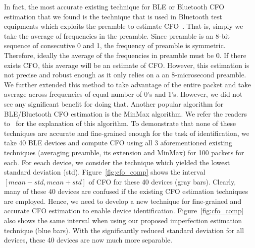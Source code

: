 In fact, the most accurate existing technique for BLE or Bluetooth CFO estimation that we found is the technique that is used in Bluetooth test equipments which exploits the preamble to estimate CFO~\cite{}. That is, simply we take the average of frequencies in the preamble. Since preamble is an 8-bit sequence of consecutive 0 and 1, the frequency of preamble is symmetric. Therefore, ideally the average of the frequencies in preamble must be 0. If there exists CFO, this average will be an estimate of CFO. However, this estimation is not precise and robust enough as it only relies on a an 8-microsecond preamble. We further extended this method to take advantage of the entire packet and take average across frequencies of equal number of 0's and 1's. However, we did not see any significant benefit for doing that. Another popular algorithm for BLE/Bluetooth CFO estimation is the MinMax algorithm. We refer the readers to~\cite{} for the explanation of this algorithm. To demonstrate that none of these techniques are accurate and fine-grained enough for the task of identification, we take 40 BLE devices and compute CFO using all 3 aforementioned existing techniques (averaging preamble, its extension and MinMax) for 100 packets for each. For eeach device, we consider the technique which yielded the lowest standard deviation (std). Figure~\ref{fig:cfo_comp} shows the interval $[mean-std,mean+std]$ of CFO for these 40 devices (gray bars). Clearly, many of these 40 devices are confused if the existing CFO estimation techniques are employed. Hence, we need to develop a new technique for fine-grained and accurate CFO estimation to enable device identification. Figure~\ref{fig:cfo_comp} also shows the same interval when using our proposed imperfection estimation technique (blue bars). With the significantly reduced standard deviation for all devices, these 40 devices are now much more separable.

